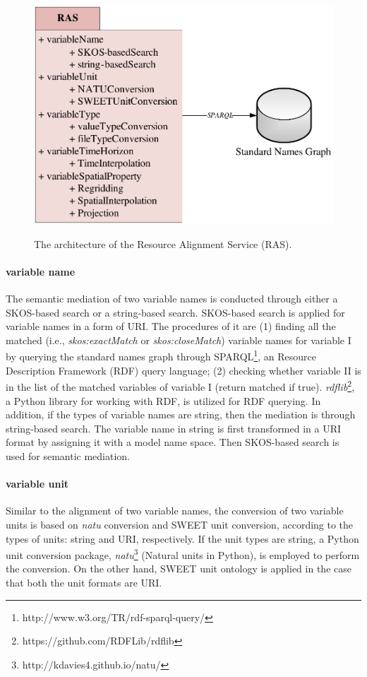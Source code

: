 \documentclass[review]{elsarticle}
\begin{document}
\begin{figure}[!htbp]
\centering
\includegraphics[scale=0.4]{../figures/figure_5}
\label{figure5}
\caption{The architecture of the Resource Alignment Service (RAS).}
\end{figure}

\paragraph{variable name} The semantic mediation of two variable names is conducted through either a SKOS-based search or a string-based search. SKOS-based search is applied for variable names in a form of URI. The procedures of it are (1) finding all the matched (i.e., \textit{skos:exactMatch} or \textit{skos:closeMatch}) variable names for variable I by querying the standard names graph through SPARQL\footnote{http://www.w3.org/TR/rdf-sparql-query/}, an Resource Description Framework (RDF) query language; (2) checking whether variable II is in the list of the matched variables of variable I (return matched if true). \textit{rdflib}\footnote{https://github.com/RDFLib/rdflib}, a Python library for working with RDF, is utilized for RDF querying. In addition, if the types of variable names are string, then the mediation is through string-based search. The variable name in string is first transformed in a URI format by assigning it with a model name space. Then SKOS-based search is used for semantic mediation. 

\paragraph{variable unit} Similar to the alignment of two variable names, the conversion of two variable units is based on \textit{natu} conversion and SWEET unit conversion, according to the types of units: string and URI, respectively. If the unit types are string, a Python unit conversion package, \textit{natu}\footnote{http://kdavies4.github.io/natu/} (Natural units in Python), is employed to perform the conversion. On the other hand, SWEET unit ontology is applied in the case that both the unit formats are URI. 
\end{document}
